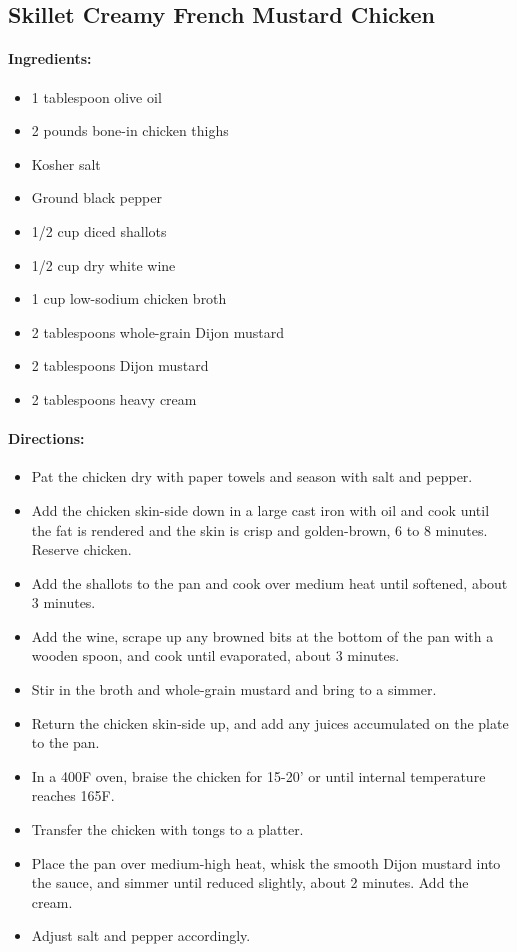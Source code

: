 \documentclass{article}
\begin{document}
\subsection{Skillet Creamy French Mustard Chicken}

\paragraph{Ingredients:}
\begin{itemize}
    \item 1 tablespoon olive oil
    \item 2 pounds bone-in chicken thighs
    \item Kosher salt
    \item Ground black pepper
    \item 1/2 cup diced shallots
    \item 1/2 cup dry white wine
    \item 1 cup low-sodium chicken broth
    \item 2 tablespoons whole-grain Dijon mustard
    \item 2 tablespoons Dijon mustard
    \item 2 tablespoons heavy cream
\end{itemize}

\paragraph{Directions:}
\begin{itemize}
    \item Pat the chicken dry with paper towels and season with salt and pepper.
    \item Add the chicken skin-side down in a large cast iron with oil and cook until the fat is rendered and the skin is crisp and golden-brown, 6 to 8 minutes. Reserve chicken.
    \item Add the shallots to the pan and cook over medium heat until softened, about 3 minutes.
    \item Add the wine, scrape up any browned bits at the bottom of the pan with a wooden spoon, and cook until evaporated, about 3 minutes.
    \item Stir in the broth and whole-grain mustard and bring to a simmer.
    \item Return the chicken skin-side up, and add any juices accumulated on the plate to the pan.
    \item In a 400F oven, braise the chicken for 15-20’ or until internal temperature reaches 165F.
    \item Transfer the chicken with tongs to a platter.
    \item Place the pan over medium-high heat, whisk the smooth Dijon mustard into the sauce, and simmer until reduced slightly, about 2 minutes. Add the cream.
    \item Adjust salt and pepper accordingly.
\end{itemize}
\end{document}

